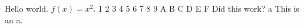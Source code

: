 \documentclass[a4paper]{article}
\begin{document}
Hello world. $f(x)=x^2$.
{ 1 2 3 4 5 6 7 8 9 A B C D E F}
Did this work?
{\foo a}
This is an a.
\end{document}
